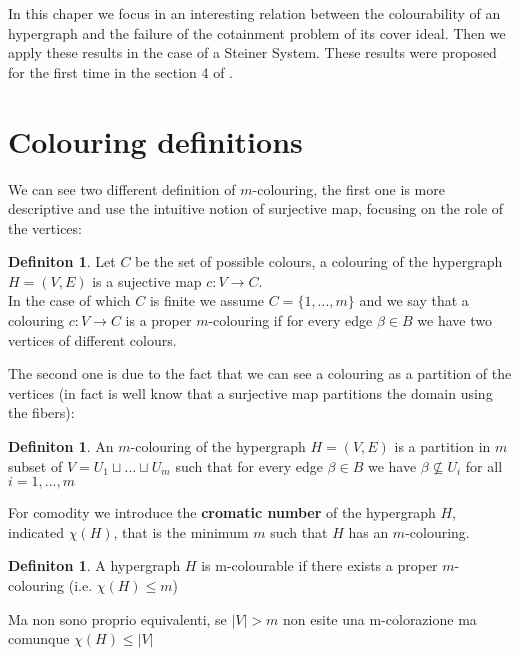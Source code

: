 \documentclass[]{book}
\theoremstyle{plain}
\theoremstyle{remark}
\theoremstyle{definition}
\newtheorem{deff}[teo]{Definiton}
\begin{document}
In this chaper we focus in an interesting relation between the colourability of an hypergraph and  the failure of the cotainment problem of its cover ideal. Then we apply these results in the case of a Steiner System. These results were proposed for the first time in the section 4 of \cite{Bal21Steiner}.
 
\section{Colouring definitions}

We can see two different definition of $ m $-colouring, the first one is more descriptive and use the intuitive notion of surjective map, focusing on the role of the vertices: 
\begin{deff}\label{def:colouring1}
Let $ C $ be the set of possible colours, a colouring of the hypergraph $ H = (V,E) $ is a sujective map $ c : V \to C $. \\
In the case of which $ C $ is finite we assume $ C = \{ 1 , ... , m\} $ and we say that a colouring $ c : V \to C $ is a proper $ m $-colouring if for every edge $ \beta \in B $ we have two vertices of different colours. 
\end{deff}

The second one is due to the fact that we can see a colouring as a partition of the vertices (in fact is well know that a surjective map partitions the domain using the fibers):

\begin{deff}
An $ m $-colouring of the hypergraph $ H = (V,E) $ is a partition in $ m $ subset of $ V = U_1 \sqcup ... \sqcup U_m $ such that for every edge $ \beta \in B $ we have $ \beta \not \subseteq U_i $ for all $ i = 1, ... , m $
\end{deff}
 
For comodity we introduce the \textbf{cromatic number} of the hypergraph $ H $, indicated $ \chi(H) $, that is the minimum $ m $ such that $ H $ has an $ m $-colouring.

\begin{deff}
A hypergraph $ H $ is m-colourable if there exists a proper $ m $-colouring (i.e. $ \chi(H) \leq m $)
\end{deff}

\begin{tboxque}
Ma non sono proprio equivalenti, se $ |V| > m $ non esite una m-colorazione ma comunque $ \chi(H) \leq |V| $
\end{tboxque}
\end{document}
